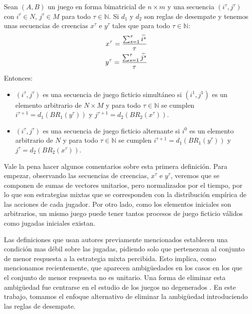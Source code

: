 \begin{definition} \label{def:fp:berger}
    Sean $(A, B)$ un juego en forma bimatricial de $n \times m$ y una secuencia $(i^\tau, j^\tau)$ con $i^\tau \in N$, $j^\tau \in M$ para todo $\tau \in \mathbb{N}$. Si $d_1$ y $d_2$ son reglas de desempate y tenemos unas secuencias de creencias $x^\tau$ e $y^\tau$ tales que para todo $\tau \in \mathbb{N}$:
    \begin{gather*}
        x^\tau= \frac{\sum^\tau_{s=1} \widetilde{i^s}}{\tau}  \\
        y^\tau= \frac{\sum^\tau_{s=1} \widetilde{j^s}}{\tau}
    \end{gather*}
    Entonces:
    \begin{itemize}
        \item $(i^\tau, j^\tau)$ es una secuencia de juego ficticio simultáneo si $(i^1, j^1)$ es un elemento arbitrario de $N \times M$ y para todo $\tau \in \mathbb{N}$ se cumplen $i^{\tau+1} = d_1(BR_1(y^\tau))$ y $j^{\tau+1} = d_2(BR_2(x^\tau))$.
        \item $(i^\tau, j^\tau)$ es una secuencia de juego ficticio alternante si $i^0$ es un elemento arbitrario de $N$ y para todo $\tau \in \mathbb{N}$ se cumplen $i^{\tau+1} = d_1(BR_1(y^\tau))$ y $j^{\tau} = d_2(BR_2(x^\tau))$.
    \end{itemize}
\end{definition}

Vale la pena hacer algunos comentarios sobre esta primera definición. Para empezar, observando las secuencias de creencias, $x^\tau$ e $y^\tau$, veremos que se componen de sumas de vectores unitarios, pero normalizados por el tiempo, por lo que son estrategias mixtas que se corresponden con la distribución empírica de las acciones de cada jugador. Por otro lado, como los elementos iniciales son arbitrarios, un mismo juego puede tener tantos procesos de juego ficticio válidos como jugadas iniciales existan.

Las definiciones que usan autores previamente mencionados establecen una condición mas débil sobre las jugadas, pidiendo solo que pertenezcan al conjunto de menor respuesta a la estrategia mixta percibida. Esto implica, como mencionamos recientemente, que aparecen ambigüedades en los casos en los que el conjunto de menor respuesta no es unitario. Una forma de eliminar esta ambigüedad fue centrarse en el estudio de los juegos no degenerados \cite{browns:original}. En este trabajo, tomamos el enfoque alternativo de eliminar la ambigüedad introduciendo las reglas de desempate.

